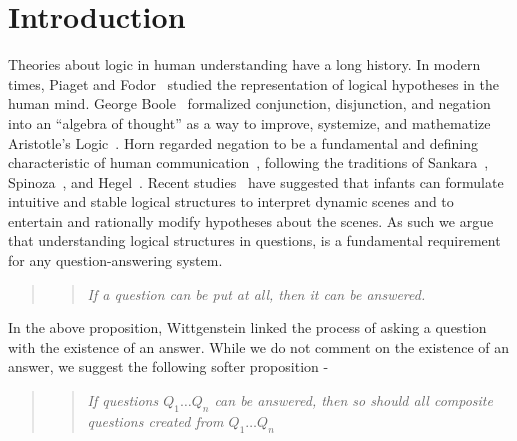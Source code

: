 \section{Introduction}
Theories about logic in human understanding have a long history. 
In modern times, Piaget and Fodor~\citep{piattelli1980language} studied the representation of logical hypotheses in the human mind.
George Boole~\citep{boole1854investigation} formalized conjunction, disjunction, and negation into an ``algebra of thought'' as a way to improve, systemize, and mathematize Aristotle's Logic~\citep{corcoran1972completeness}.
Horn regarded negation to be a fundamental and defining characteristic of human communication~\citep{horn2000negation}, following the traditions of Sankara~\citep{raju1954principle}, Spinoza~\citep{spinoza1934ethics}, and Hegel~\citep{hegel1929hegel}.
Recent studies~\citep{arlotti1263} have suggested that infants can formulate intuitive and stable logical structures to interpret dynamic scenes and to entertain and rationally modify hypotheses about the scenes.
As such we argue that understanding logical structures in questions, is a fundamental requirement for any question-answering system.
\begin{quotation}
    \begin{quote}
        \textit{If a question can be put at all, then it can be answered.}\\
    \end{quote}
\end{quotation}
In the above proposition, Wittgenstein linked the process of asking a question with the existence of an answer.
While we do not comment on the existence of an answer, we suggest the following softer proposition -
\begin{quotation}
    \begin{quote}
        \textit{If questions $Q_1\dots Q_n$ can be answered, then so should all composite questions created from $Q_1\dots Q_n$}
    \end{quote}
\end{quotation}

